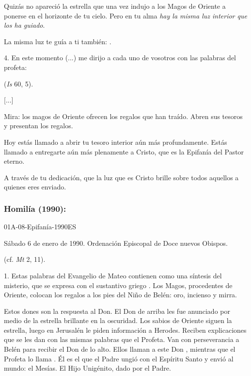 \begin{body}
	Quizás no apareció la estrella que una vez indujo a los Magos de Oriente a ponerse en el horizonte de tu cielo. Pero en tu alma \emph{hay la misma luz interior que los ha guiado}.
	
	La misma luz te guía a ti también: .
	
	4. En este momento (...) me dirijo a cada uno de vosotros con las palabras del profeta:
	
	 (\emph{Is} 60, 5).
	
	{[}...{]}
	
	Mira: los magos de Oriente ofrecen los regalos que han traído. Abren sus tesoros y presentan los regalos.
	
	Hoy estás llamado a abrir tu tesoro interior aún más profundamente. Estás llamado a entregarte aún más plenamente a Cristo, que es la Epifanía del Pastor eterno.
	
	A través de tu dedicación, que la luz que es Cristo brille sobre todos aquellos a quienes eres enviado.
	
	\subsubsection{Homilía (1990): } 01A-08-Epifanía-1990ES
	
	Sábado 6 de enero de 1990. Ordenación Episcopal de Doce nuevos Obispos.
	
	 (cf. \emph{Mt} 2, 11).
	
	1. Estas palabras del Evangelio de Mateo contienen como una síntesis del misterio, que se expresa con el sustantivo griego . Los Magos, procedentes de Oriente, colocan los regalos a los pies del Niño de Belén: oro, incienso y mirra.
	
	Estos dones son la respuesta al Don. El Don de arriba les fue anunciado por medio de la estrella brillante en la oscuridad. Los sabios de Oriente siguen la estrella, luego en Jerusalén le piden información a Herodes. Reciben explicaciones que se les dan con las mismas palabras que el Profeta. Van con perseverancia a Belén para recibir el Don de lo alto. Ellos llaman a este Don , mientras que el Profeta lo llama . Él es el que el Padre ungió con el Espíritu Santo y envió al mundo: el Mesías. El Hijo Unigénito, dado por el Padre.
	

\end{body}
